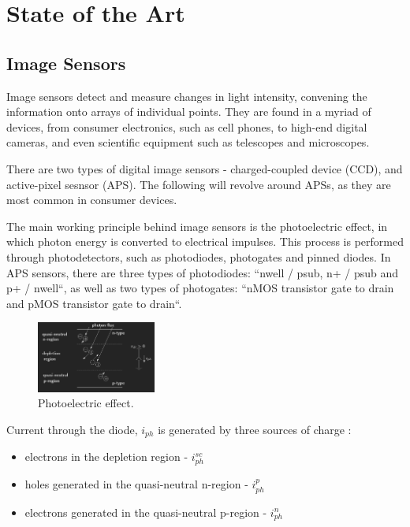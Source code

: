 \section{State of the Art}

\subsection{Image Sensors}

Image sensors detect and measure changes in light intensity, convening the information onto arrays of individual
points. They are found in a myriad of devices, from consumer electronics, such as cell phones, to high-end 
digital cameras, and even scientific equipment such as telescopes and microscopes. 

There are two types of digital image sensors - charged-coupled device (CCD), and active-pixel sesnsor (APS).
The following will revolve around APSs, as they are most common in consumer devices.

The main working principle behind image sensors is the photoelectric effect, in which photon energy is converted
to electrical impulses. This process is performed through photodetectors, such as photodiodes, photogates and 
pinned diodes. In APS sensors, there are three types of photodiodes: ``nwell / psub, n+ / psub and p+ / nwell``,
as well as two types of photogates: ``nMOS transistor gate to drain and pMOS transistor gate to drain``. \cite{stanford}

\begin{figure}[H]
    \includegraphics[width=0.35\textwidth, height=0.25\textwidth]{resources/png/photoelectric.jpg}
    \caption{Photoelectric effect. \cite{stanford} \label{figPhotoel}}
\end{figure}

Current through the diode, \(i_{ph}\) is generated by three sources of charge \cite{stanford}:
\begin{itemize}
    \item electrons in the depletion region - \(i^{sc}_{ph}\)
    \item holes generated in the quasi-neutral n-region - \(i^{p}_{ph}\)
    \item electrons generated in the quasi-neutral p-region - \(i^{n}_{ph}\)
\end{itemize}

